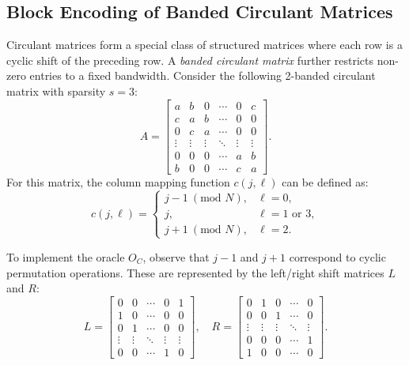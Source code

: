 \documentclass{article}
\begin{document}
    \subsection{Block Encoding of Banded Circulant Matrices}\label{sec:banded_circulant}

    Circulant matrices form a special class of structured matrices where each row is a cyclic shift of the preceding row. A \emph{banded circulant matrix} further restricts non-zero entries to a fixed bandwidth. Consider the following 2-banded circulant matrix with sparsity $s=3$:
    $$
    A =
    \begin{bmatrix}
        a      & b      & 0      & \cdots & 0      & c      \\
        c      & a      & b      & \cdots & 0      & 0      \\
        0      & c      & a      & \cdots & 0      & 0      \\
        \vdots & \vdots & \vdots & \ddots & \vdots & \vdots \\
        0      & 0      & 0      & \cdots & a      & b      \\
        b      & 0      & 0      & \cdots & c      & a
    \end{bmatrix}.\label{eq:example_circulant_matrix}
    $$
    For this matrix, the column mapping function $c(j, \ell)$ can be defined as:
    $$
    c(j, \ell) =
    \begin{cases}
        j-1 \ (\text{mod } N), & \ell = 0, \\
        j, & \ell = 1 \text{ or } 3, \\
        j+1 \ (\text{mod } N), & \ell = 2.
    \end{cases}\label{eq:equation13}
    $$

    To implement the oracle $O_C$, observe that $j-1$ and $j+1$ correspond to cyclic permutation operations. These are represented by the left/right shift matrices $L$ and $R$:
    $$
    L =
    \begin{bmatrix}
        0      & 0      & \cdots & 0      & 1      \\
        1      & 0      & \cdots & 0      & 0      \\
        0      & 1      & \cdots & 0      & 0      \\
        \vdots & \vdots & \ddots & \vdots & \vdots \\
        0      & 0      & \cdots & 1      & 0
    \end{bmatrix}, \quad
    R =
    \begin{bmatrix}
        0      & 1      & 0      & \cdots & 0      \\
        0      & 0      & 1      & \cdots & 0      \\
        \vdots & \vdots & \vdots & \ddots & \vdots \\
        0      & 0      & 0      & \cdots & 1      \\
        1      & 0      & 0      & \cdots & 0
    \end{bmatrix}.\label{eq:equation14}
    $$
\end{document}
